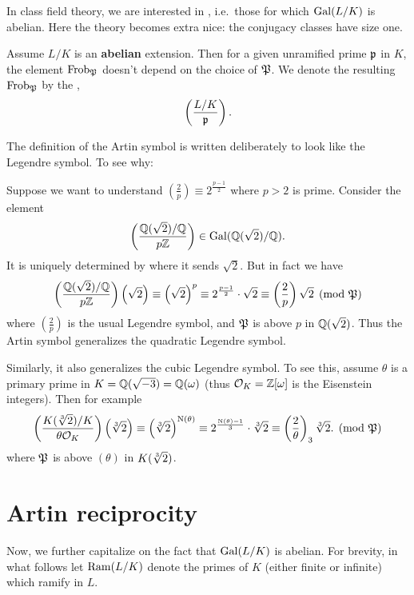 In class field theory, we are interested in ,
i.e.\ those for which $\operatorname{Gal}(L/K)$ is abelian.
Here the theory becomes extra nice:
the conjugacy classes have size one.
\begin{definition}
	Assume $L/K$ is an \textbf{abelian} extension.
	Then for a given unramified prime $\mathfrak p$ in $K$,
	the element $\mathrm{Frob}_\mathfrak P$ doesn't depend on the choice of $\mathfrak P$.
	We denote the resulting $\mathrm{Frob}_\mathfrak P$ by the ,
	\[ \left( \frac{L/K}{\mathfrak p} \right). \]
\end{definition}
The definition of the Artin symbol is written deliberately to
look like the Legendre symbol.
To see why:
\begin{example}
	Suppose we want to understand
	$\left( \frac 2p \right) \equiv 2^{\frac{p-1}{2}}$ where $p > 2$ is prime.
	Consider the element
	\[ \left( \frac{\mathbb Q(\sqrt 2)/\mathbb Q}{p\mathbb Z} \right)
		\in \operatorname{Gal}(\mathbb Q(\sqrt 2) / \mathbb Q). \]
	It is uniquely determined by where it sends $\sqrt 2$.
	But in fact we have
	\[
		\left( \frac{\mathbb Q(\sqrt 2)/\mathbb Q}{p\mathbb Z} \right) \left( \sqrt 2 \right)
		\equiv \left( \sqrt 2 \right)^{p}
		\equiv 2^{\frac{p-1}{2}} \cdot \sqrt 2
		\equiv \left( \frac 2p \right) \sqrt 2
		\pmod{\mathfrak P}
	\]
	where $\left( \frac 2p \right)$ is the usual Legendre symbol,
	and $\mathfrak P$ is above $p$ in $\mathbb Q(\sqrt 2)$.
	Thus the Artin symbol generalizes the quadratic Legendre symbol.
\end{example}
\begin{example}
	\label{ex:cubic_legendre_artin}
	Similarly, it also generalizes the cubic Legendre symbol.
	To see this, assume $\theta$ is a primary prime
	in $K = \mathbb Q(\sqrt{-3}) = \mathbb Q(\omega)$
	(thus $\mathcal O_K = \mathbb Z[\omega]$ is the Eisenstein integers).
	Then for example
	\[
		\left( \frac{K(\sqrt[3]{2})/K}{\theta \mathcal O_K} \right) \left( \sqrt[3]{2} \right)
		\equiv \left( \sqrt[3]{2} \right)^{\operatorname{N}(\theta)}
		\equiv 2^{\frac{\operatorname{N}(\theta)-1}{3}} \cdot \sqrt[3]{2}
		\equiv \left( \frac{2}{\theta} \right)_3 \sqrt[3]{2}.
		\pmod{\mathfrak P}
	\]
	where $\mathfrak P$ is above $(\theta)$ in $K(\sqrt[3]{2})$.
\end{example}

\section{Artin reciprocity}
Now, we further capitalize on the fact that $\operatorname{Gal}(L/K)$ is abelian.
For brevity, in what follows let $\operatorname{Ram}(L/K)$ denote the primes of $K$
(either finite or infinite) which ramify in $L$.

